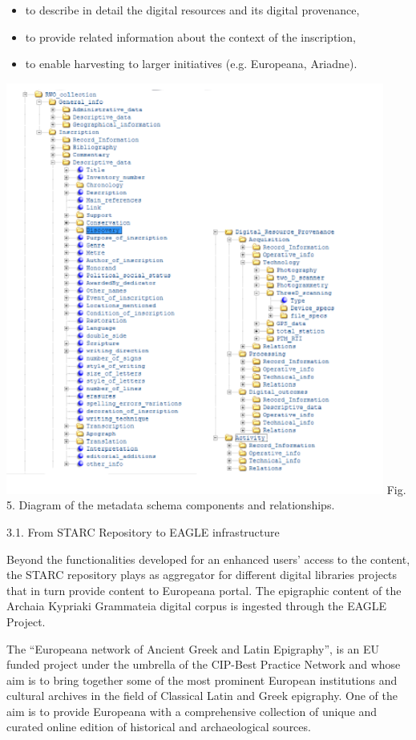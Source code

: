\documentclass[amsthm,ebook]{saparticle}
\begin{document}
\begin{itemize}
\item to describe in detail the digital resources and its digital provenance, 
\item to provide related information about the context of the inscription, 
\item to enable harvesting to larger initiatives (e.g. Europeana, Ariadne).
\end{itemize}

\bigskip

 \includegraphics[width=12.435cm,height=13.573cm]{DamnjanovicetalEAGLE2016-img005.pdf}  Fig. 5. Diagram of the metadata
schema components and relationships.

3.1. From STARC Repository to EAGLE infrastructure

Beyond the functionalities developed for an enhanced users’ access to the content, the STARC repository plays as
aggregator for different digital libraries projects that in turn provide content to Europeana portal. The epigraphic
content of the Archaia Kypriaki Grammateia digital corpus is ingested through the EAGLE Project. 

The “Europeana network of Ancient Greek and Latin Epigraphy”, is an EU funded project under the umbrella of the CIP-Best
Practice Network and whose aim is to bring together some of the most prominent European institutions and cultural
archives in the field of Classical Latin and Greek epigraphy. One of the aim is to provide Europeana with a
comprehensive collection of unique and curated online edition of historical and archaeological sources.
\end{document}
